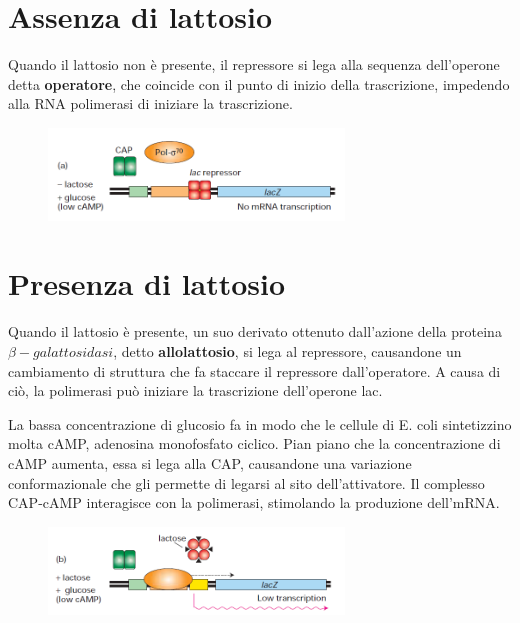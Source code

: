 \documentclass[10pt,a4paper]{article}
\begin{document}
	\section{Assenza di lattosio}
	
	Quando il lattosio non è presente, il repressore si lega alla sequenza dell'operone detta \textbf{operatore}, che coincide con il punto di inizio della trascrizione, impedendo alla RNA polimerasi di iniziare la trascrizione.
	
	\begin{figure}[h]
		\centering
		\includegraphics[width=0.7\textwidth]{operone no lac.png}	
	\end{figure}
	
	
	\section{Presenza di lattosio}
	
	Quando il lattosio è presente, un suo derivato ottenuto dall'azione della proteina $\beta-galattosidasi$, detto \textbf{allolattosio}, si lega al repressore, causandone un cambiamento di struttura che fa staccare il repressore dall'operatore. A causa di ciò, la polimerasi può iniziare la trascrizione dell'operone lac.
	
	La bassa concentrazione di glucosio fa in modo che le cellule di E. coli sintetizzino molta cAMP, adenosina monofosfato ciclico. Pian piano che la concentrazione di cAMP aumenta, essa si lega alla CAP, causandone una variazione conformazionale che gli permette di legarsi al sito dell'attivatore. Il complesso CAP-cAMP interagisce con la polimerasi, stimolando la produzione dell'mRNA.
	
	\begin{figure}[h]
		\centering
		\includegraphics[width=0.7\textwidth]{operone si lac.png}
	\end{figure}
	
\end{document}
